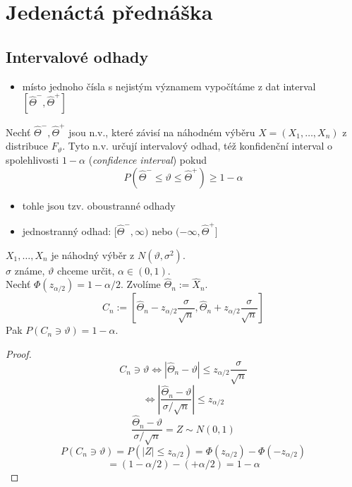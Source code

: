\documentclass[../main.tex]{subfiles}
\begin{document}
\section{Jedenáctá přednáška}

\subsection{Intervalové odhady}
\begin{itemize}
    \item místo jednoho čísla s nejistým významem vypočítáme z dat interval $\left[\widehat{\Theta}^-, \widehat{\Theta}^+\right]$
\end{itemize}

\begin{definition}
    Nechť $\widehat{\Theta}^-, \widehat{\Theta}^+$ jsou n.v.,
    které závisí na náhodném výběru 
    $X = (X_1,\dots,X_n)$ z distribuce $F_{\vartheta}$. Tyto n.v. určují intervalový odhad, též konfidenční interval o spolehlivosti
    $1-\alpha$ (\textit{confidence interval}) pokud 
    \[P(\widehat{\Theta}^- \leq \vartheta \leq \widehat{\Theta}^+) \geq 1 - \alpha\]
    \begin{itemize}
        \item tohle jsou tzv. oboustranné odhady
        \item jednostranný odhad: $[\widehat{\Theta}^-, \infty)$ nebo $(-\infty, \widehat{\Theta}^+]$
    \end{itemize}
\end{definition}

\begin{theorem}
    $X_1,\dots,X_n$ je náhodný výběr z $N(\vartheta, \sigma^2)$.\\
    $\sigma$ známe, $\vartheta$ chceme určit, $\alpha \in (0,1)$.\\
    Nechť $\Phi(z_{\alpha/2}) = 1 - \alpha / 2$. Zvolíme $\widehat{\Theta}_n := \widehat{X}_n$.
    \[C_n := \left[\widehat{\Theta}_n - z_{\alpha/2}\frac{\sigma}{\sqrt{n}}, \widehat{\Theta}_n + z_{\alpha/2}\frac{\sigma}{\sqrt{n}}\right]\]
    Pak $P(C_n \ni \vartheta) = 1 - \alpha$.
\end{theorem}
\begin{proof}
    \[C_n \ni \vartheta \Leftrightarrow |\widehat{\Theta}_n - \vartheta | \leq z_{\alpha/2}\frac{\sigma}{\sqrt{n}}\]
    \[\Leftrightarrow \left|\frac{\widehat{\Theta}_n - \vartheta}{\sigma/\sqrt{n}}\right| \leq z_{\alpha/2}\]
    \[ \frac{\widehat{\Theta}_n - \vartheta}{\sigma/\sqrt{n}} = Z \sim N(0,1)\]
    \[P(C_n \ni \vartheta) = P(|Z| \leq z_{\alpha/2}) = \Phi(z_{\alpha/2}) - \Phi(-z_{\alpha/2})\]
    \[= (1- \alpha/2) - (+ \alpha/2) = 1 - \alpha\]
\end{proof}
\end{document}
